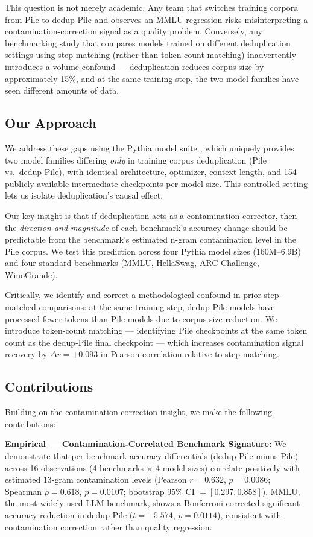 This question is not merely academic. Any team that switches training corpora from
Pile to dedup-Pile and observes an MMLU regression risks misinterpreting a
contamination-correction signal as a quality problem. Conversely, any benchmarking
study that compares models trained on different deduplication settings using
step-matching (rather than token-count matching) inadvertently introduces a
volume confound --- deduplication reduces corpus size by approximately 15\%, and at the
same training step, the two model families have seen different amounts of data.

\subsection{Our Approach}

We address these gaps using the Pythia model suite \citep{Biderman2023Pythia}, which
uniquely provides two model families differing \textit{only} in training corpus deduplication
(Pile vs.\ dedup-Pile), with identical architecture, optimizer, context length, and
154 publicly available intermediate checkpoints per model size. This controlled
setting lets us isolate deduplication's causal effect.

Our key insight is that if deduplication acts as a contamination corrector, then
the \textit{direction and magnitude} of each benchmark's accuracy change should be
predictable from the benchmark's estimated n-gram contamination level in the
Pile corpus. We test this prediction across four Pythia model sizes (160M--6.9B)
and four standard benchmarks (MMLU, HellaSwag, ARC-Challenge, WinoGrande).

Critically, we identify and correct a methodological confound in prior step-matched
comparisons: at the same training step, dedup-Pile models have processed fewer
tokens than Pile models due to corpus size reduction. We introduce token-count
matching --- identifying Pile checkpoints at the same token count as the
dedup-Pile final checkpoint --- which increases contamination signal recovery by
$\Delta r = +0.093$ in Pearson correlation relative to step-matching.

\subsection{Contributions}

Building on the contamination-correction insight, we make the following contributions:

\textbf{Empirical --- Contamination-Correlated Benchmark Signature:}
We demonstrate that per-benchmark accuracy differentials (dedup-Pile minus Pile) across
16 observations (4 benchmarks $\times$ 4 model sizes) correlate positively with
estimated 13-gram contamination levels (Pearson $r = 0.632$, $p = 0.0086$; Spearman
$\rho = 0.618$, $p = 0.0107$; bootstrap 95\% CI $= [0.297, 0.858]$). MMLU, the
most widely-used LLM benchmark, shows a Bonferroni-corrected significant accuracy
reduction in dedup-Pile ($t = -5.574$, $p = 0.0114$), consistent with contamination
correction rather than quality regression.

